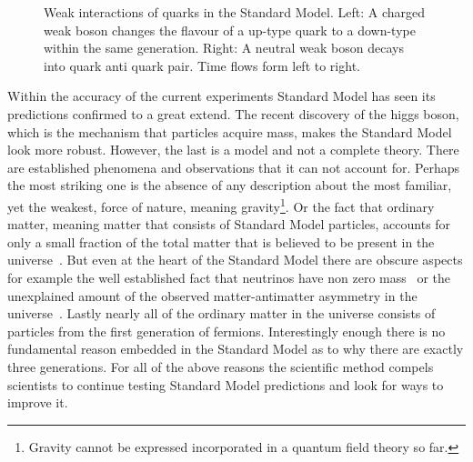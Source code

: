 \begin{figure}[h]
  \centering
  {\sffamily }
  \caption{Weak interactions of quarks in the Standard Model. Left: A charged weak boson changes the flavour of a up-type quark to a down-type within the same generation.
           Right: A neutral weak boson decays into quark anti quark pair. Time flows form left to right.}
  \label{WeakInteractions}
\end{figure}

Within the accuracy of the current experiments Standard Model has seen its predictions confirmed to a great extend.
The recent discovery of the higgs boson, which is the mechanism that particles acquire mass, makes the Standard Model look
more robust. However, the last is a model and not a complete theory. There are established phenomena and observations that it can not
account for. Perhaps the most striking one is the absence of any description about the most familiar, yet the weakest, force of nature,
meaning gravity\footnote{Gravity cannot be expressed incorporated in a quantum field theory so far.}.
Or the fact that ordinary matter, meaning matter that consists of Standard Model particles, accounts for only a small fraction of the total matter
that is believed to be present in the universe~\cite{dmatter-Hinshaw}. But even at the heart of the Standard Model there are obscure aspects for example the well established fact
that neutrinos have non zero mass~\cite{nu-mass-superkam,nu-mass-kamland,nu-mass-sno,nu-mass-daya} or the unexplained amount of the observed
matter-antimatter asymmetry in the universe~\cite{more-cpv-huet,more-cpv-gavela_I,more-cpv-gavela_II}.
Lastly nearly all of the ordinary matter in the universe consists of
particles from the first generation of fermions. Interestingly enough there is no fundamental reason embedded in the Standard Model
as to why there are exactly three generations. For all of the above reasons the scientific method compels scientists to continue
testing Standard Model predictions and look for ways to improve it.
